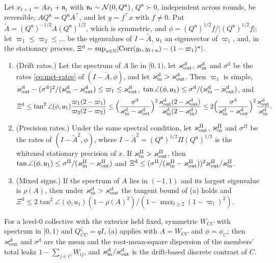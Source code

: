 \begin{lemma}\label{lem:met-discrete-closure}
Let $x_{t+1}=Ax_t+\mathfrak n_t$ with $\mathfrak n_t\sim\mathcal{N}(0,Q^{\mathfrak n})$, $Q^{\mathfrak n}\succ0$, independent across rounds, be reversible, $AQ^{\mathfrak n}=Q^{\mathfrak n}A^\top$, and let $y=f^\top x$ with $f\neq0$. Put $\tilde A=(Q^{\mathfrak n})^{-1/2}A(Q^{\mathfrak n})^{1/2}$, which is symmetric, and $\phi=(Q^{\mathfrak n})^{1/2}f/\lvert(Q^{\mathfrak n})^{1/2}f\rvert$; let $\varpi_1\le\varpi_2\le\dots$ be the eigenvalues of $I-\tilde A$, $\mathsf u_1$ an eigenvector of $\varpi_1$, and, in the stationary process, $\Xi^{\mathrm d}=\sup_{u\in\mathbb N}\lvert\operatorname{Corr}(y_t,y_{t+u})-(1-\varpi_1)^u\rvert$.
\begin{enumerate}
\item[(a)] (Drift rates.) Let the spectrum of $A$ lie in $[0,1)$, let $\varkappa_{\mathrm{out}}^{\mathrm d}$, $\varkappa_{\mathrm{in}}^{\mathrm d}$ and $\sigma^{\mathrm d}$ be the rates \eqref{eq:met-rates} of $(I-\tilde A,\phi)$, and let $\varkappa_{\mathrm{in}}^{\mathrm d}>\varkappa_{\mathrm{out}}^{\mathrm d}$. Then $\varpi_1$ is simple, $\varkappa_{\mathrm{out}}^{\mathrm d}-(\sigma^{\mathrm d})^2/(\varkappa_{\mathrm{in}}^{\mathrm d}-\varkappa_{\mathrm{out}}^{\mathrm d})\le\varpi_1\le\varkappa_{\mathrm{out}}^{\mathrm d}$, $\tan\angle(\phi,\mathsf u_1)\le\sigma^{\mathrm d}/(\varkappa_{\mathrm{in}}^{\mathrm d}-\varkappa_{\mathrm{out}}^{\mathrm d})$, and
\begin{equation}\label{eq:met-discrete}
\Xi^{\mathrm d}\le\tan^2\angle(\phi,\mathsf u_1)\frac{\varpi_1(2-\varpi_1)}{\varpi_2(2-\varpi_2)}\le\Bigl(\frac{\sigma^{\mathrm d}}{\varkappa_{\mathrm{in}}^{\mathrm d}-\varkappa_{\mathrm{out}}^{\mathrm d}}\Bigr)^2\frac{\varkappa_{\mathrm{out}}^{\mathrm d}(2-\varkappa_{\mathrm{out}}^{\mathrm d})}{\varkappa_{\mathrm{in}}^{\mathrm d}(2-\varkappa_{\mathrm{in}}^{\mathrm d})}\le2\Bigl(\frac{\sigma^{\mathrm d}}{\varkappa_{\mathrm{in}}^{\mathrm d}-\varkappa_{\mathrm{out}}^{\mathrm d}}\Bigr)^2\frac{\varkappa_{\mathrm{out}}^{\mathrm d}}{\varkappa_{\mathrm{in}}^{\mathrm d}}.
\end{equation}
\item[(b)] (Precision rates.) Under the same spectral condition, let $\varkappa_{\mathrm{out}}^\Pi$, $\varkappa_{\mathrm{in}}^\Pi$ and $\sigma^\Pi$ be the rates of $(I-\tilde A^2,\phi)$, where $I-\tilde A^2=(Q^{\mathfrak n})^{1/2}\Pi(Q^{\mathfrak n})^{1/2}$ is the whitened stationary precision of $x$. If $\varkappa_{\mathrm{in}}^\Pi>\varkappa_{\mathrm{out}}^\Pi$, then $\tan\angle(\phi,\mathsf u_1)\le\sigma^\Pi/(\varkappa_{\mathrm{in}}^\Pi-\varkappa_{\mathrm{out}}^\Pi)$ and $\Xi^{\mathrm d}\le(\sigma^\Pi/(\varkappa_{\mathrm{in}}^\Pi-\varkappa_{\mathrm{out}}^\Pi))^2\varkappa_{\mathrm{out}}^\Pi/\varkappa_{\mathrm{in}}^\Pi$.
\item[(c)] (Mixed signs.) If the spectrum of $A$ lies in $(-1,1)$ and its largest eigenvalue is $\rho(A)$, then under $\varkappa_{\mathrm{in}}^{\mathrm d}>\varkappa_{\mathrm{out}}^{\mathrm d}$ the tangent bound of (a) holds and $\Xi^{\mathrm d}\le2\tan^2\angle(\phi,\mathsf u_1)(1-\rho(A)^2)/(1-\max_{l\ge2}(1-\varpi_l)^2)$.
\end{enumerate}
For a level-0 collective with the exterior held fixed, symmetric $W_{CC}$ with spectrum in $[0,1)$ and $Q^\zeta_{CC}=qI$, (a) applies with $A=W_{CC}$ and $\phi=\phi_C$; then $\varkappa_{\mathrm{out}}^{\mathrm d}$ and $\sigma^{\mathrm d}$ are the mean and the root-mean-square dispersion of the members' total leaks $1-\sum_{j\in C}W_{ij}$, and $\varkappa_{\mathrm{in}}^{\mathrm d}/\varkappa_{\mathrm{out}}^{\mathrm d}$ is the drift-based discrete contrast of $C$.
\end{lemma}
